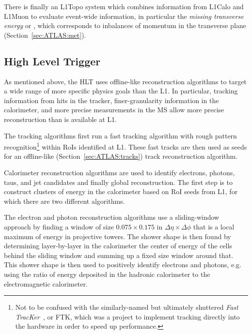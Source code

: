 There is finally an L1Topo system which combines information from L1Calo and L1Muon to evaluate event-wide information, in particular the \textit{missing transverse energy} or \Etmiss{}, which corresponds to inbalances of momentum in the transverse plane (Section~\ref{sec:ATLAS:met}).

\subsection{High Level Trigger}
\label{sec:ATLAS:HLT}

As mentioned above, the HLT uses offline-like reconstruction algorithms to target a wide range of more specific physics goals than the L1.
In particular, tracking information from hits in the tracker, finer-granularity information in the calorimeter, and more precise measurements in the MS allow more precise reconstruction than is available at L1.

The tracking algorithms first run a fast tracking algorithm with rough pattern recognition\footnote{Not to be confused with the similarly-named but ultimately shuttered \textit{Fast TracKer}~\cite{Shochet:1552953}, or FTK, which was a project to implement tracking directly into the hardware in order to speed up performance.} within RoIs identified at L1.
These fast tracks are then used as seeds for an offline-like (Section~\ref{sec:ATLAS:tracks}) track reconstruction algorithm.

Calorimeter reconstruction algorithms are used to identify electrons, photons, taus, and jet candidates and finally \etmiss{} global reconstruction.
The first step is to construct clusters of energy in the calorimeter based on RoI seeds from L1, for which there are two different algorithms.

The electron and photon reconstruction algorithms use a sliding-window approach by finding a window of size $0.075 \times 0.175$ in $\Delta\eta \times \Delta\phi$ that is a local maximum of energy in projective towers.
The shower shape is then found by determining layer-by-layer in the calorimeter the center of energy of the cells behind the sliding window and summing up a fixed size window around that.
This shower shape is then used to positively identify electrons and photons, e.g. using the ratio of energy deposited in the hadronic calorimeter to the electromagnetic calorimeter.

